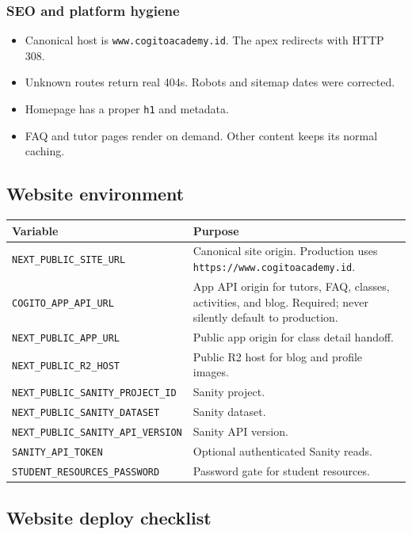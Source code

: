 \documentclass[11pt,a4paper]{article}
\newcommand{\code}[1]{\texttt{#1}}
\begin{document}
\subsubsection{SEO and platform hygiene}
\begin{itemize}
	\item Canonical host is \code{www.cogitoacademy.id}. The apex redirects with HTTP 308.
	\item Unknown routes return real 404s. Robots and sitemap dates were corrected.
	\item Homepage has a proper \code{h1} and metadata.
	\item FAQ and tutor pages render on demand. Other content keeps its normal caching.
\end{itemize}

\subsection{Website environment}

{\footnotesize
\begin{tabular}{@{}L{5.2cm}L{10.4cm}@{}}
\toprule
\textbf{Variable} & \textbf{Purpose} \\
\midrule
\code{NEXT\_PUBLIC\_SITE\_URL} & Canonical site origin. Production uses \code{https://www.cogitoacademy.id}. \\
\code{COGITO\_APP\_API\_URL} & App API origin for tutors, FAQ, classes, activities, and blog. Required; never silently default to production. \\
\code{NEXT\_PUBLIC\_APP\_URL} & Public app origin for class detail handoff. \\
\code{NEXT\_PUBLIC\_R2\_HOST} & Public R2 host for blog and profile images. \\
\code{NEXT\_PUBLIC\_SANITY\_\allowbreak PROJECT\_ID} & Sanity project. \\
\code{NEXT\_PUBLIC\_SANITY\_\allowbreak DATASET} & Sanity dataset. \\
\code{NEXT\_PUBLIC\_SANITY\_\allowbreak API\_VERSION} & Sanity API version. \\
\code{SANITY\_API\_TOKEN} & Optional authenticated Sanity reads. \\
\code{STUDENT\_RESOURCES\_\allowbreak PASSWORD} & Password gate for student resources. \\
\bottomrule
\end{tabular}
}

\subsection{Website deploy checklist}
\end{document}
